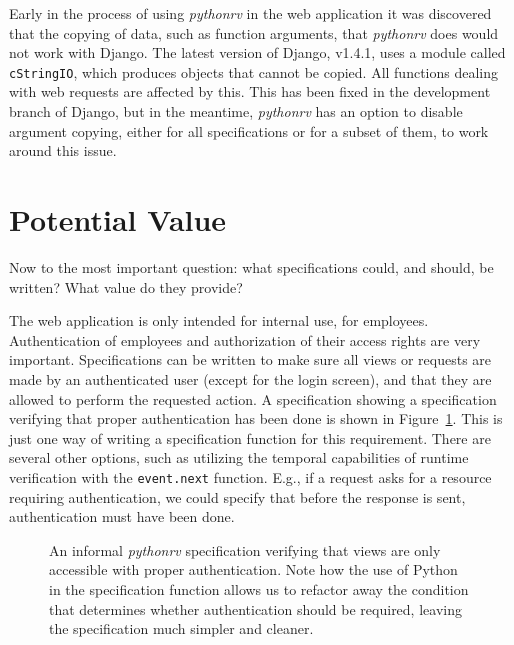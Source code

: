 \documentclass[a4paper,11pt]{kth-mag}
\theoremstyle{definition}
\begin{document}
Early in the process of using \textit{pythonrv} in the web application it was
discovered that the copying of data, such as function arguments, that
\textit{pythonrv} does would not work with Django. The latest version of
Django, v1.4.1, uses a module called \texttt{cStringIO}, which produces objects
that cannot be copied. All functions dealing with web requests are affected by
this. This has been fixed in the development branch of Django, but in the
meantime, \textit{pythonrv} has an option to disable argument copying, either
for all specifications or for a subset of them, to work around this issue.


\section{Potential Value}

Now to the most important question: what specifications could, and should, be
written? What value do they provide?

The web application is only intended for internal use, for employees.
Authentication of employees and authorization of their access rights are very
important. Specifications can be written to make sure all views or requests are
made by an authenticated user (except for the login screen), and that they are
allowed to perform the requested action. A specification showing a
specification verifying that proper authentication has been done is shown in
Figure~\ref{figure-app-authentication-informal}. This is just one way of
writing a specification function for this requirement. There are several other
options, such as utilizing the temporal capabilities of runtime verification
with the \texttt{event.next} function. E.g., if a request asks for a resource
requiring authentication, we could specify that before the response is sent,
authentication must have been done.

\begin{figure}[h!]
	\begin{center}
	\begin{minipage}{0.9\textwidth}
	
	\end{minipage}
	\end{center}

  \caption{An informal \textit{pythonrv} specification verifying that views are
    only accessible with proper authentication. Note how the use of Python in
    the specification function allows us to refactor away the condition that
    determines whether authentication should be required, leaving the
    specification much simpler and cleaner.}
	\label{figure-app-authentication-informal}
\end{figure}
\end{document}

